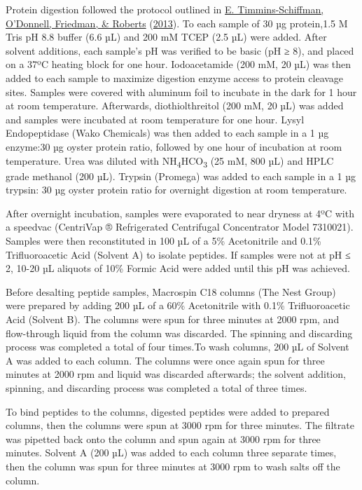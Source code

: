 \documentclass [11pt, proquest] {uwthesis}[2015/03/03]
\begin{document}
Protein digestion followed the protocol outlined in \protect\hyperlink{ref-Timmins-Schiffman2013}{E. Timmins-Schiffman, O'Donnell, Friedman, \& Roberts} (\protect\hyperlink{ref-Timmins-Schiffman2013}{2013}). To each sample of 30 µg protein,1.5 M Tris pH 8.8 buffer (6.6 µL) and 200 mM TCEP (2.5 µL) were added. After solvent additions, each sample's pH was verified to be basic (pH ≥ 8), and placed on a 37ºC heating block for one hour. Iodoacetamide (200 mM, 20 µL) was then added to each sample to maximize digestion enzyme access to protein cleavage sites. Samples were covered with aluminum foil to incubate in the dark for 1 hour at room temperature. Afterwards, diothiolthreitol (200 mM, 20 µL) was added and samples were incubated at room temperature for one hour. Lysyl Endopeptidase (Wako Chemicals) was then added to each sample in a 1 µg enzyme:30 µg oyster protein ratio, followed by one hour of incubation at room temperature. Urea was diluted with NH\textsubscript{4}HCO\textsubscript{3} (25 mM, 800 µL) and HPLC grade methanol (200 µL). Trypsin (Promega) was added to each sample in a 1 µg trypsin: 30 µg oyster protein ratio for overnight digestion at room temperature.

After overnight incubation, samples were evaporated to near dryness at 4ºC with a speedvac (CentriVap ® Refrigerated Centrifugal Concentrator Model 7310021). Samples were then reconstituted in 100 µL of a 5\% Acetonitrile and 0.1\% Trifluoroacetic Acid (Solvent A) to isolate peptides. If samples were not at pH ≤ 2, 10-20 µL aliquots of 10\% Formic Acid were added until this pH was achieved.

Before desalting peptide samples, Macrospin C18 columns (The Nest Group) were prepared by adding 200 µL of a 60\% Acetonitrile with 0.1\% Trifluoroacetic Acid (Solvent B). The columns were spun for three minutes at 2000 rpm, and flow-through liquid from the column was discarded. The spinning and discarding process was completed a total of four times.To wash columns, 200 µL of Solvent A was added to each column. The columns were once again spun for three minutes at 2000 rpm and liquid was discarded afterwards; the solvent addition, spinning, and discarding process was completed a total of three times.

To bind peptides to the columns, digested peptides were added to prepared columns, then the columns were spun at 3000 rpm for three minutes. The filtrate was pipetted back onto the column and spun again at 3000 rpm for three minutes. Solvent A (200 µL) was added to each column three separate times, then the column was spun for three minutes at 3000 rpm to wash salts off the column.
\end{document}
